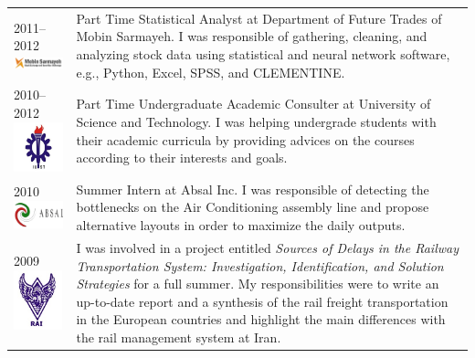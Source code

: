\documentclass[10PT,letter]{article}
\begin{document}
\begin{tabular}{p{1.2in}p{5.55in}}
						\textsc{2011--2012}\vspace{1mm}\newline \includegraphics[width=2.75cm]{static/logos/Mobien} &
											Part Time Statistical Analyst at Department of Future Trades of Mobin Sarmayeh.
											I was responsible of gathering, cleaning, and analyzing   stock  data using statistical and neural network software, e.g., Python, Excel, SPSS, and CLEMENTINE. \\[3mm]
											
						\textsc{2010--2012}\vspace{1mm}\newline \includegraphics[width=1.5cm]{static/logos/IUST} &
										Part Time Undergraduate Academic Consulter  at University of Science and Technology. 
										I was helping undergrade students with their academic curricula by providing advices on the courses according to their interests and goals. \\[3mm]
										
						\textsc{2010}\vspace{1mm}\newline \includegraphics[width=1.95cm]{static/logos/ABSAL} &
										Summer Intern  at Absal Inc. 
										I was responsible of detecting the bottlenecks on the Air Conditioning assembly  line and propose alternative  layouts in order to maximize the daily outputs. \\[3mm]
						
						\textsc{2009} \vspace{1mm} \newline \includegraphics[width=1.4cm]{static/logos/RAI} & 
										I was involved in a project entitled \textit{Sources of Delays in the Railway Transportation System: Investigation, Identification, and Solution Strategies} for a full summer. My responsibilities were to write an up-to-date  report and a synthesis of the rail freight transportation in the European countries and highlight the main differences with the rail management system at Iran.  

						
			\end{tabular}
\end{document}
